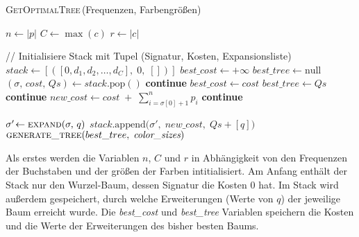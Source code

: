 \documentclass[a4paper,10pt,ngerman]{scrartcl}
\begin{document}
    \begin{algorithm} [H]
        \caption{\textsc{GetOptimalTree}\,(Frequenzen, Farbengrößen)}
        \label{alg:optimal_tree}
        \begin{algorithmic}[1]
                \State $n \gets |p|$  
                \State $C \gets \max(c)$ 
                \State $r \gets |c|$  

                \State // Initialisiere Stack mit Tupel (Signatur, Kosten, Expansionsliste)
                \State $stack \gets [([0, d_1, d_2, \dots, d_C],\;0,\;[])]$
                \State $best\_cost \gets +\infty$
                \State $best\_tree \gets \text{null}$
                    \State $(\sigma,\,cost,\,Qs) \gets stack.\mathrm{pop}()$
                        \State \textbf{continue}
                    \EndIf
                            \State $best\_cost \gets cost$
                            \State $best\_tree \gets Qs$
                        \EndIf
                        \State \textbf{continue}
                    \EndIf
                    \State $new\_cost \gets cost \;+\;\sum_{i=\sigma[0]+1}^{n} p_i$
                        \State \textbf{continue}
                    \EndIf


                        \State $\sigma'\!\gets \textsc{expand}(\sigma,\,q)$
                        \State $stack.\mathrm{append}\bigl(\sigma',\;new\_cost,\;Qs + [q]\bigr)$
                    \EndFor
                \EndWhile
                \State \Return $\textsc{generate\_tree}(best\_tree,\;\textit{color\_sizes})$
            \EndFunction
        \end{algorithmic}
    \end{algorithm}
    Als erstes werden die Variablen $n$, $C$ und $r$ in Abhängigkeit von den Frequenzen der Buchstaben und der größen der Farben intitialisiert.
    Am Anfang enthält der Stack nur den Wurzel-Baum, dessen Signatur die Kosten 0 hat.
    Im Stack wird außerdem gespeichert, durch welche Erweiterungen (Werte von $q$) der jeweilige Baum erreicht wurde.
    Die \textit{best\_cost} und \textit{best\_tree} Variablen speichern die Kosten und die Werte der Erweiterungen des bisher besten Baums.
\end{document}
